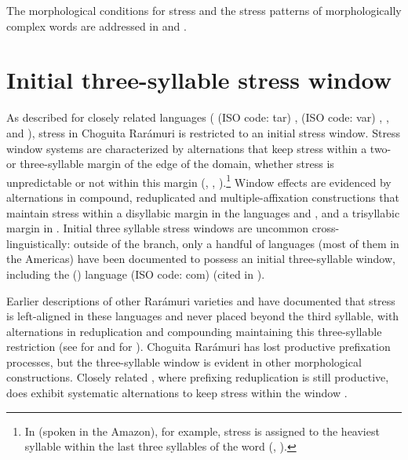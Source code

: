 The morphological conditions for stress and the stress patterns of morphologically complex words are addressed in  and .

\section{Initial three-syllable stress window}
\label{subsubsec: initial three-syllable stress window}

As described for closely related  languages ( (ISO code: tar) \parencite{brambila1953gramatica},  (ISO code: var) \parencite{miller1996guarijio},  \parencite{demers1999prominence}, and  \parencite{hagberg1989floating}), stress in Choguita Rarámuri is restricted to an initial stress window. Stress window systems are characterized by alternations that keep stress within a two- or three-syllable margin of the edge of the domain, whether stress is unpredictable or not within this margin (\citealt{kager2012stress}, \citealt{everett1988metrical}, \citealt{green1995lapse}).\footnote{In  (spoken in the Amazon), for example, stress is assigned to the heaviest syllable within the last three syllables of the word (\citealt{everett1988metrical}, \citealt{green1995lapse}).} Window effects are evidenced by alternations in compound, reduplicated and multiple-affixation constructions that maintain stress within a disyllabic margin in the  languages  and , and a trisyllabic margin in . Initial three syllable stress windows are uncommon cross-linguistically:  outside of the  branch, only a handful of languages (most of them in the Americas) have been documented to possess an initial three-syllable window, including the  () language  (ISO code: com) \citep[][299]{smalley1953phonemic} (cited in \citealt{kager2012stress}).

Earlier descriptions of other Rarámuri varieties and  have documented that stress is left-aligned in these languages and never placed beyond the third syllable, with alternations in reduplication and compounding maintaining this three-syllable restriction (see \citealt[][245]{brambila1953gramatica} for  and \citealt[][49--50]{miller1996guarijio} for ). Choguita Rarámuri has lost productive prefixation processes, but the three-syllable window is evident in other morphological constructions. Closely related , where prefixing reduplication is still productive, does exhibit systematic alternations to keep stress within the window \parencite{miller1996guarijio}.

